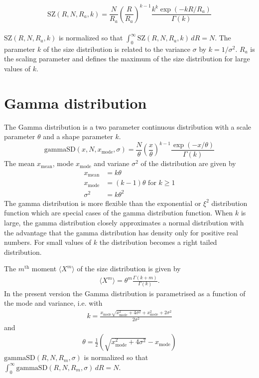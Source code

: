 \begin{equation}
\text{SZ}(R,N,R_a,k) =  \frac{N}{R_a}
\left(\frac{R}{R_a}\right)^{k-1}
\frac{k^k\exp(-kR/R_a)}{\Gamma(k)}
\end{equation}
~\\
$\text{SZ}(R,N,R_a,k)$ is normalized so that $\int_0^\infty\!
\text{SZ}(R,N,R_a,k)\,dR = N$. The parameter $k$ of the size
distribution is related to the variance $\sigma$ by
$k={1}/{\sigma^2}$. $R_a$ is the scaling parameter and defines the
maximum of the size distribution for large values of $k$.


\clearpage
\section{Gamma distribution}

The Gamma distribution is a two parameter continuous distribution with
a scale parameter $\theta$ and a shape parameter $k$.
\begin{equation}
\text{gammaSD}(x,N,x_\text{mode},\sigma) =  \frac{N}{\theta}
\left(\frac{x}{\theta}\right)^{k-1}
\frac{\exp(-x/\theta)}{\Gamma(k)} \label{GammaSDEq}
\end{equation}
The mean $x_\text{mean}$, mode $x_\text{mode}$ and variane $\sigma^2$
of the distribution are given by
\begin{align}
x_\text{mean}   &= k\theta \\
x_\text{mode}   &= (k-1)\theta \text{ for } k\geq 1 \\
\sigma^2        &= k\theta^2
\end{align}
The gamma distribution is more flexible than the exponential or $\xi^2$ distribution
function which are special cases of the gamma distribution function.
When $k$ is large, the gamma distribution closely approximates a normal distribution
with the advantage that the gamma distribution has density only for positive real
numbers. For small values of $k$ the distribution becomes a right tailed distribution.

The $m^\text{th}$ moment $\langle X^m\rangle$ of the size distribution is given by
\begin{align}
\langle X^m\rangle = \theta^m \frac{\Gamma(k+m)}{\Gamma(k)} .
\end{align}
In the present version the Gamma distribution is parametrised as a function
of the mode and variance, i.e.
with
\begin{align}
k=\frac{x_\text{mode} \sqrt{x_\text{mode}^2+4
   \sigma^2}+x_\text{mode}^2+2 \sigma ^2}{2 \sigma^2}
\end{align}
 and
\begin{align}
 \theta = \frac{1}{2}
   \left(\sqrt{x_\text{mode}^2+4 \sigma ^2}-x_\text{mode}\right)
\end{align}
$\text{gammaSD}(R,N,R_m,\sigma)$ is normalized so that
$\int_0^\infty\! \text{gammaSD}(R,N,R_m,\sigma)\,dR = N$.

